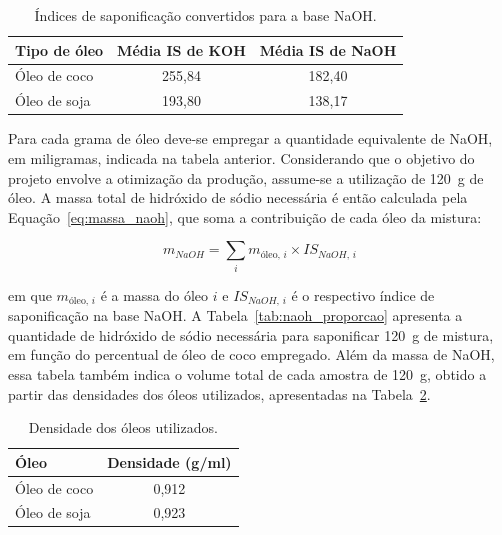 \begin{table}[H]
    \centering
    \footnotesize
    \caption{Índices de saponificação convertidos para a base NaOH.}
    \label{tab:is_naoh}
    \begin{tabular}{lcc}
        \toprule
        \textbf{Tipo de óleo} & \textbf{Média IS de KOH} & \textbf{Média IS de NaOH} \\
        \midrule
        Óleo de coco & 255,84 & 182,40 \\
        Óleo de soja & 193,80 & 138,17 \\
        \bottomrule
    \end{tabular}
\end{table}

Para cada grama de óleo deve-se empregar a quantidade equivalente de NaOH, em miligramas, indicada na tabela anterior. Considerando que o objetivo do projeto envolve a otimização da produção, assume-se a utilização de 120~g de óleo. A massa total de hidróxido de sódio necessária é então calculada pela Equação~\ref{eq:massa_naoh}, que soma a contribuição de cada óleo da mistura:

\begin{equation}
    m_{NaOH} = \sum_{i} m_{\text{óleo},\,i} \times IS_{NaOH,\,i}
    \label{eq:massa_naoh}
\end{equation}

\noindent em que $m_{\text{óleo},\,i}$ é a massa do óleo $i$ e $IS_{NaOH,\,i}$ é o respectivo índice de saponificação na base NaOH. A Tabela~\ref{tab:naoh_proporcao} apresenta a quantidade de hidróxido de sódio necessária para saponificar 120~g de mistura, em função do percentual de óleo de coco empregado. Além da massa de NaOH, essa tabela também indica o volume total de cada amostra de 120~g, obtido a partir das densidades dos óleos utilizados, apresentadas na Tabela~\ref{tab:densidades}.

\begin{table}[H]
    \centering
    \footnotesize
    \caption{Densidade dos óleos utilizados.}
    \label{tab:densidades}
    \begin{tabular}{lc}
        \toprule
        \textbf{Óleo} & \textbf{Densidade (g/ml)} \\
        \midrule
        Óleo de coco & 0,912 \\
        Óleo de soja & 0,923 \\
        \bottomrule
    \end{tabular}
\end{table}

